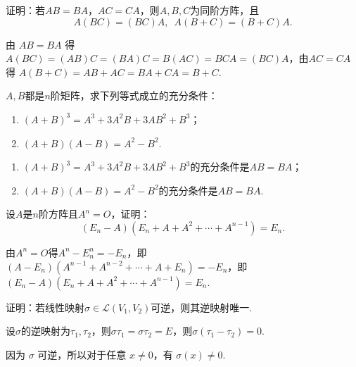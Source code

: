 \begin{exercise}

    \begin{exgroup}
        \item 证明：若$AB=BA$，$AC=CA$，则$A,B,C$为同阶方阵，且
        \[A(BC)=(BC)A,\enspace A(B+C)=(B+C)A.\]

        \begin{answer}
            由 $AB=BA$ 得 $A(BC)=(AB)C=(BA)C=B(AC)=BCA=(BC)A$，由$AC=CA$ 得 $A(B+C)=AB+AC=BA+CA=B+C$.
        \end{answer}

        \item $A,B$都是$n$阶矩阵，求下列等式成立的充分条件：
        \begin{enumerate}
            \item $(A+B)^3=A^3+3A^2B+3AB^2+B^3$；

            \item $(A+B)(A-B)=A^2-B^2$.
        \end{enumerate}

        \begin{answer}
            \begin{enumerate}
                \item $(A+B)^3=A^3+3A^2B+3AB^2+B^3$的充分条件是$AB=BA$；

                \item $(A+B)(A-B)=A^2-B^2$的充分条件是$AB=BA$.
            \end{enumerate}
        \end{answer}

        \item 设$A$是$n$阶方阵且$A^n=O$，证明：
        \[(E_n-A)(E_n+A+A^2+\cdots+A^{n-1})=E_n.\]
        \begin{answer}
            由$A^n=O$得$A^n-E_n^n=-E_n$，即$(A-E_n)(A^{n-1}+A^{n-2}+\cdots+A+E_n)=-E_n$，即$(E_n-A)(E_n+A+A^2+\cdots+A^{n-1})=E_n$.
        \end{answer}

        \item 证明：若线性映射$\sigma \in \mathcal{L}(V_1,V_2)$可逆，则其逆映射唯一.
        \begin{answer}
            设$\sigma$的逆映射为$\tau_1,\tau_2$，则$\sigma\tau_1=\sigma\tau_2=E$，则$\sigma(\tau_1-\tau_2)=0$.

            因为 $\sigma$ 可逆，所以对于任意 $x \neq 0$，有 $\sigma(x) \neq 0$.


\end{answer}
\end{exgroup}
\end{exercise}
